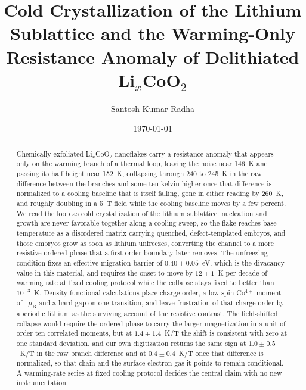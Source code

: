 \documentclass[reprint,twocolumn,prb,amsmath,amssymb,superscriptaddress,floatfix]{revtex4-2}
\newcommand{\muBs}{\mu_{\mathrm{B}}}
\begin{document}
\title{Cold Crystallization of the Lithium Sublattice and the Warming-Only
Resistance Anomaly of Delithiated Li$_x$CoO$_2$}

\author{Santosh Kumar Radha}

\date{\today}

\begin{abstract}
Chemically exfoliated Li$_x$CoO$_2$ nanoflakes carry a resistance anomaly that appears only on
the warming branch of a thermal loop, leaving the noise near 146~K and passing its half height
near 152~K, collapsing through 240 to 245~K in the raw difference between the branches and some
ten kelvin higher once that difference is normalized to a cooling baseline that is itself
falling, gone in either reading by 260~K, and roughly
doubling in a 5~T field while the cooling baseline moves by a few percent. We read the loop as
cold crystallization of the lithium sublattice: nucleation and growth are never favorable
together along a cooling sweep, so the flake reaches base temperature as a disordered matrix
carrying quenched, defect-templated embryos, and those embryos grow as soon as lithium
unfreezes, converting the channel to a more resistive ordered phase that a first-order boundary
later removes. The unfreezing condition fixes an effective migration barrier of
$0.40\pm0.05$~eV, which is the divacancy value in this material, and requires the onset to move
by $12\pm1$~K per decade of warming rate at fixed cooling protocol while the collapse stays
fixed to better than $10^{-3}$~K. Density-functional calculations place charge order, a
low-spin Co$^{4+}$ moment of \comomentRow~$\muBs$ and a hard gap on one transition, and leave
frustration of that charge order by aperiodic lithium as the surviving account of the resistive
contrast. The field-shifted collapse would require the ordered phase to carry the larger
magnetization in a unit of order ten correlated moments, but at $1.4\pm1.4$~K/T the shift is
consistent with zero at one standard deviation, and our own digitization returns the same sign
at $1.0\pm0.5$~K/T in the raw branch difference and at $0.4\pm0.4$~K/T once that difference is
normalized, so that chain and the surface electron gas it
points to remain conditional. A warming-rate series at fixed cooling protocol decides the
central claim with no new instrumentation.
\end{abstract}

\maketitle
\end{document}
